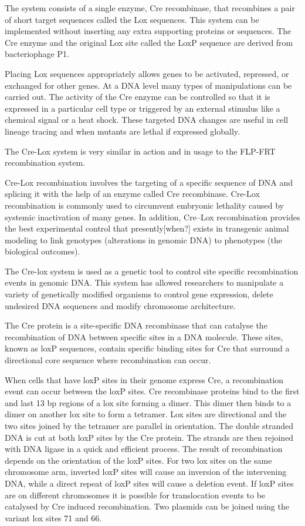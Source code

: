 The system consists of a single enzyme, Cre recombinase, that recombines a pair of short target sequences called the Lox sequences. This system can be implemented without inserting any extra supporting proteins or sequences. The Cre enzyme and the original Lox site called the LoxP sequence are derived from bacteriophage P1.

Placing Lox sequences appropriately allows genes to be activated, repressed, or exchanged for other genes. At a DNA level many types of manipulations can be carried out. The activity of the Cre enzyme can be controlled so that it is expressed in a particular cell type or triggered by an external stimulus like a chemical signal or a heat shock. These targeted DNA changes are useful in cell lineage tracing and when mutants are lethal if expressed globally.

The Cre-Lox system is very similar in action and in usage to the FLP-FRT recombination system.

Cre-Lox recombination involves the targeting of a specific sequence of DNA and splicing it with the help of an enzyme called Cre recombinase. Cre-Lox recombination is commonly used to circumvent embryonic lethality caused by systemic inactivation of many genes. In addition, Cre--Lox recombination provides the best experimental control that presently{[}when?{]} exists in transgenic animal modeling to link genotypes (alterations in genomic DNA) to phenotypes (the biological outcomes).

The Cre-lox system is used as a genetic tool to control site specific recombination events in genomic DNA. This system has allowed researchers to manipulate a variety of genetically modified organisms to control gene expression, delete undesired DNA sequences and modify chromosome architecture.

The Cre protein is a site-specific DNA recombinase that can catalyse the recombination of DNA between specific sites in a DNA molecule. These sites, known as loxP sequences, contain specific binding sites for Cre that surround a directional core sequence where recombination can occur.

When cells that have loxP sites in their genome express Cre, a recombination event can occur between the loxP sites. Cre recombinase proteins bind to the first and last 13 bp regions of a lox site forming a dimer. This dimer then binds to a dimer on another lox site to form a tetramer. Lox sites are directional and the two sites joined by the tetramer are parallel in orientation. The double stranded DNA is cut at both loxP sites by the Cre protein. The strands are then rejoined with DNA ligase in a quick and efficient process. The result of recombination depends on the orientation of the loxP sites. For two lox sites on the same chromosome arm, inverted loxP sites will cause an inversion of the intervening DNA, while a direct repeat of loxP sites will cause a deletion event. If loxP sites are on different chromosomes it is possible for translocation events to be catalysed by Cre induced recombination. Two plasmids can be joined using the variant lox sites 71 and 66.

